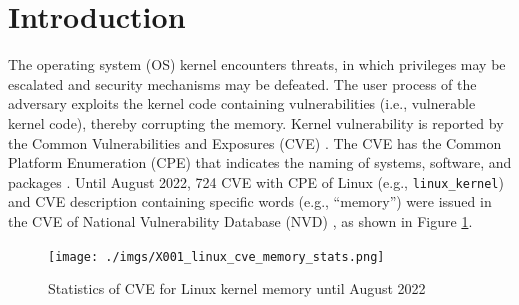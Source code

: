 \section{Introduction}\label{seciton:introduction}
%
The operating system (OS) kernel encounters threats, in which privileges may be
escalated and security mechanisms may be defeated.
The user process of the adversary exploits the kernel code containing
vulnerabilities (i.e., vulnerable kernel code), thereby corrupting the memory.
%
Kernel vulnerability is reported by the Common Vulnerabilities and Exposures
(CVE) \cite{cve}. The CVE has the Common Platform Enumeration (CPE) that
indicates the naming of systems, software, and packages \cite{cpe}.
%
Until August 2022, 724 CVE with CPE of Linux (e.g., \verb|linux_kernel|) and CVE
description containing specific words (e.g., ``memory'') were issued in the CVE of
National Vulnerability Database (NVD) \cite{nvd}, as shown in
Figure \ref{fig:linux_memory_cve}.

\begin{figure}[tb]
    \hspace{-5ex}
        \begin{center}
          \texttt{[image: ./imgs/X001\_linux\_cve\_memory\_stats.png]}
        \end{center}
        \caption{
          Statistics of CVE for Linux kernel memory until August 2022 \cite{nvd}
        }
        \label{fig:linux_memory_cve}
\end{figure}


